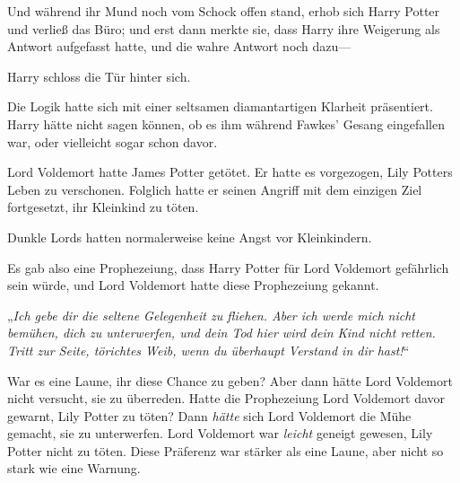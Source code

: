 Und während ihr Mund noch vom Schock offen stand, erhob sich Harry Potter und verließ das Büro; und erst dann merkte sie, dass Harry ihre Weigerung als Antwort aufgefasst hatte, und die wahre Antwort noch dazu—

Harry schloss die Tür hinter sich.

Die Logik hatte sich mit einer seltsamen diamantartigen Klarheit präsentiert. Harry hätte nicht sagen können, ob es ihm während Fawkes' Gesang eingefallen war, oder vielleicht sogar schon davor.

Lord Voldemort hatte James Potter getötet. Er hatte es vorgezogen, Lily Potters Leben zu verschonen. Folglich hatte er seinen Angriff mit dem einzigen Ziel fortgesetzt, ihr Kleinkind zu töten.

Dunkle Lords hatten normalerweise keine Angst vor Kleinkindern.

Es gab also eine Prophezeiung, dass Harry Potter für Lord Voldemort gefährlich sein würde, und Lord Voldemort hatte diese Prophezeiung gekannt.

„\emph{Ich gebe dir die seltene Gelegenheit zu fliehen. Aber ich werde mich nicht bemühen, dich zu unterwerfen, und dein Tod hier wird dein Kind nicht retten. Tritt zur Seite, törichtes Weib, wenn du überhaupt Verstand in dir hast!}“

War es eine Laune, ihr diese Chance zu geben? Aber dann hätte Lord Voldemort nicht versucht, sie zu überreden. Hatte die Prophezeiung Lord Voldemort davor gewarnt, Lily Potter zu töten? Dann \emph{hätte} sich Lord Voldemort die Mühe gemacht, sie zu unterwerfen. Lord Voldemort war \emph{leicht} geneigt gewesen, Lily Potter nicht zu töten. Diese Präferenz war stärker als eine Laune, aber nicht so stark wie eine Warnung.

